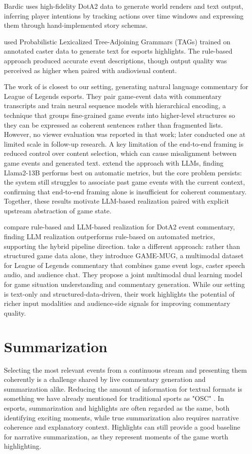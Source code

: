 Bardic \cite{barot2017} uses high-fidelity DotA2 data to generate world renders and text output, inferring player intentions by tracking actions over time windows and expressing them through hand-implemented story schemas.

\citet{elarewaju2020} used Probabilistic Lexicalized Tree-Adjoining Grammars (TAGs) trained on annotated caster data to generate text for esports highlights. The rule-based approach produced accurate event descriptions, though output quality was perceived as higher when paired with audiovisual content.

The work of \citet{wang2021} is closest to our setting, generating natural language commentary for League of Legends esports. They pair game-event data with commentary transcripts and train neural sequence models with hierarchical encoding, a technique that groups fine-grained game events into higher-level structures so they can be expressed as coherent sentences rather than fragmented lists. However, no viewer evaluation was reported in that work; \citet{wang2024} later conducted one at limited scale in follow-up research. A key limitation of the end-to-end framing is reduced control over content selection, which can cause misalignment between game events and generated text. \citet{wang2024} extend the approach with LLMs, finding Llama2-13B performs best on automatic metrics, but the core problem persists: the system still struggles to associate past game events with the current context, confirming that end-to-end framing alone is insufficient for coherent commentary. Together, these results motivate LLM-based realization paired with explicit upstream abstraction of game state.

\citet{zhang2022} compare rule-based and LLM-based realization for DotA2 event commentary, finding LLM realization outperforms rule-based on automated metrics, supporting the hybrid pipeline direction. \citet{zhang2024} take a different approach: rather than structured game data alone, they introduce GAME-MUG, a multimodal dataset for League of Legends commentary that combines game event logs, caster speech audio, and audience chat. They propose a joint multimodal dual learning model for game situation understanding and commentary generation. While our setting is text-only and structured-data-driven, their work highlights the potential of richer input modalities and audience-side signals for improving commentary quality.

\section{Summarization}
Selecting the most relevant events from a continuous stream and presenting them coherently is a challenge shared by live commentary generation and summarization alike. Reducing the amount of information for textual formats is something we have already mentioned for traditional sports as "OSC" \cite{lewandowski2012}. In esports, summarization and highlights are often regarded as the same, both identifying exciting moments, while true summarization also requires narrative coherence and explanatory context. Highlights can still provide a good baseline for narrative summarization, as they represent moments of the game worth highlighting.

